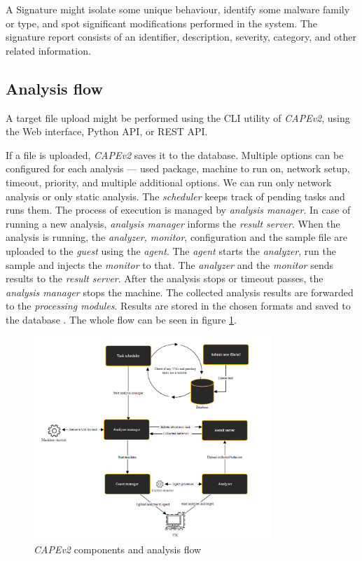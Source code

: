 A Signature might isolate some unique behaviour, identify some malware family or type, and spot significant modifications performed in the system. The signature report consists of an identifier, description, severity, category, and other related information.

\subsection{Analysis flow}
A target file upload might be performed using the CLI utility of \emph{CAPEv2}, using the Web interface, Python API, or REST API.

If a file is uploaded, \emph{CAPEv2} saves it to the database. Multiple options can be configured for each analysis ---  used package, machine to run on, network setup, timeout, priority, and multiple additional options. We can run only network analysis or only static analysis. The \emph{scheduler} keeps track of pending tasks and runs them. The process of execution is managed by \emph{analysis manager}. In case of running a new analysis, \emph{analysis manager} informs the \emph{result server}. When the analysis is running, the \emph{analyzer, monitor}, configuration and the sample file are uploaded to the \emph{guest} using the \emph{agent}. The \emph{agent} starts the \emph{analyzer}, run the sample and injects the \emph{monitor} to that. The \emph{analyzer} and the \emph{monitor} sends results to the \emph{result server}. After the analysis stops or timeout passes, the \emph{analysis manager} stops the machine. The collected analysis results are forwarded to the \emph{processing modules}. Results are stored in the chosen formats and saved to the database \cite{CuckooSa10:online}. The whole flow can be seen in figure \ref{fig:capeflow}.

\begin{figure}[h]
  \centering
  \includegraphics[width=0.8\textwidth]{figures/flow.png}
  \caption{\emph{CAPEv2} components and analysis flow \cite{CuckooSa10:online}}
  \label{fig:capeflow}
\end{figure}


